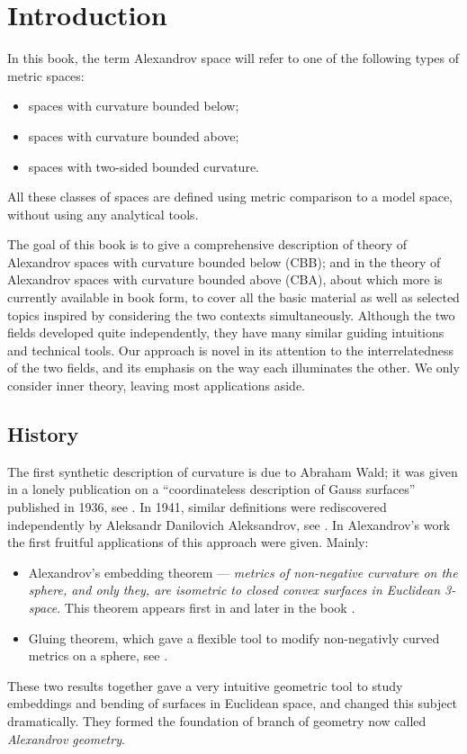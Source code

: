 \chapter*{Introduction}

In this book, the term Alexandrov space will refer to one of the following types of %
metric spaces:
\begin{itemize}
\item spaces with curvature bounded below;
\item spaces with curvature bounded above;
\item spaces with two-sided bounded curvature.
\end{itemize}
All these classes of spaces are defined using metric comparison to a model space, without using any analytical tools. 

The goal of this book is to give a comprehensive description of theory of Alexandrov spaces with curvature bounded below (CBB);  and in the theory of Alexandrov spaces with curvature bounded above (CBA), about which more is currently available in book form, to cover all the basic material as well as selected topics inspired by considering the two contexts simultaneously.  Although the two fields developed quite independently, they have many similar guiding intuitions and technical tools.  Our approach is novel in its attention to the interrelatedness of the two fields, and its emphasis on the way each illuminates the other.  We only consider inner theory, leaving most applications aside.


\section*{History}

The first synthetic description of curvature is due to Abraham Wald; 
it was given in a lonely publication on a ``coordinateless description of Gauss surfaces'' published in 1936, see \cite{wald}.
In 1941, similar definitions were rediscovered independently by Aleksandr Danilovich Aleksandrov,
see \cite{alexandrov:def}.
In Alexandrov's work the first fruitful applications of this approach were given.
Mainly:
\begin{itemize}
\item Alexandrov's embedding theorem  --- 
\textit{metrics of non-negative curvature on the sphere, and only they, are isometric to closed convex surfaces in Euclidean 3-space}. This theorem appears first in \cite{alexandrov:def} and later in the book \cite{alexandrov-embedding}.
\item Gluing theorem, which gave a flexible tool to modify non-negativly curved metrics on a sphere, see \cite{alexandrov-glueing}.
\end{itemize}
These two results together gave  a very intuitive geometric tool to study embeddings and bending of surfaces in Euclidean space, and changed this subject dramatically.
They formed the foundation of branch of geometry now called \emph{Alexandrov geometry}.

